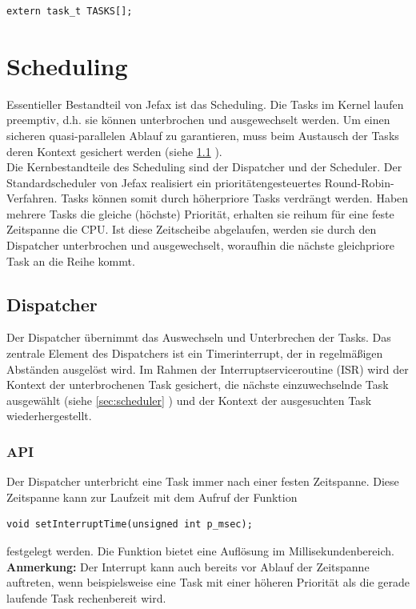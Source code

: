 \documentclass[fontsize=12pt, toc=bibliography, notitlepage]{scrreprt}
\newcommand{\refnn}[1]{\ref{#1} \nameref{#1}}
\begin{document}
\begin{lstlisting}
extern task_t TASKS[];
\end{lstlisting}

\chapter{Scheduling}
\label{chap:scheduling}
Essentieller Bestandteil von Jefax ist das Scheduling. Die Tasks im Kernel laufen preemptiv, d.h. sie können unterbrochen und ausgewechselt werden. Um einen sicheren quasi-parallelen Ablauf zu garantieren, muss beim Austausch der Tasks deren Kontext gesichert werden (siehe \refnn{sec:dispatcher}).\\
Die Kernbestandteile des Scheduling sind der Dispatcher und der Scheduler. Der Standardscheduler von Jefax realisiert ein prioritätengesteuertes Round-Robin-Verfahren. Tasks können somit durch höherpriore Tasks verdrängt werden. Haben mehrere Tasks die gleiche (höchste) Priorität, erhalten sie reihum für eine feste Zeitspanne die CPU. Ist diese Zeitscheibe abgelaufen, werden sie durch den Dispatcher unterbrochen und ausgewechselt, woraufhin die nächste gleichpriore Task an die Reihe kommt.

\section{Dispatcher}
\label{sec:dispatcher}
Der Dispatcher übernimmt das Auswechseln und Unterbrechen der Tasks. Das zentrale Element des Dispatchers ist ein Timerinterrupt, der in regelmäßigen Abständen ausgelöst wird. Im Rahmen der Interruptserviceroutine (ISR) wird der Kontext der unterbrochenen Task gesichert, die nächste einzuwechselnde Task ausgewählt (siehe \refnn{sec:scheduler}) und der Kontext der ausgesuchten Task wiederhergestellt. 

\subsection{API}
\label{subsec:dispatcher-api}
Der Dispatcher unterbricht eine Task immer nach einer festen Zeitspanne. Diese Zeitspanne kann zur Laufzeit mit dem Aufruf der Funktion 

\begin{lstlisting}[title=dispatcher.h]
void setInterruptTime(unsigned int p_msec);
\end{lstlisting}

festgelegt werden. Die Funktion bietet eine Auflösung im Millisekundenbereich.\\
\textbf{Anmerkung:} Der Interrupt kann auch bereits vor Ablauf der Zeitspanne auftreten, wenn beispielsweise eine Task mit einer höheren Priorität als die gerade laufende Task rechenbereit wird.
\end{document}
